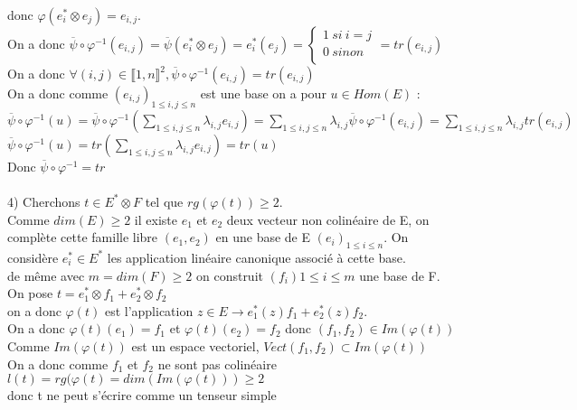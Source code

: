 \documentclass{article}
\begin{document}
donc $\varphi(e^\ast_i \otimes e_{j})= e_{i,j}$. \\
On a donc $\overline{\psi} \circ \varphi^{-1}(e_{i,j})= \overline{\psi}(e^\ast_i \otimes e_{j})=e^*_i(e_j)=\begin{cases}
1 \ si \ i=j \\
0 \ sinon \\
\end{cases}=tr(e_{i,j})$ \\
On a donc $\forall (i,j) \in \llbracket1,n\rrbracket^2,\overline{\psi} \circ \varphi^{-1}(e_{i,j})=tr(e_{i,j})$ \\
On a donc comme $(e_{i,j})_{ 1 \leq i,j \leq n}$ est une base on a pour $u \in Hom(E)$ : \\
$\overline{\psi} \circ \varphi^{-1}(u)=\overline{\psi} \circ \varphi^{-1}(\sum_{ 1 \leq i,j\leq n} \lambda_{i,j} e_{i,j})=\sum_{ 1 \leq i,j\leq n} \lambda_{i,j}\overline{\psi} \circ \varphi^{-1}(e_{i,j})=\sum_{ 1 \leq i,j\leq n}\lambda_{i,j} tr(e_{i,j})$ \\
$\overline{\psi} \circ \varphi^{-1}(u)= tr(\sum_{ 1 \leq i,j\leq n}\lambda_{i,j} e_{i,j})=tr(u)$ \\
Donc $\overline{\psi} \circ \varphi^{-1}=tr$ \\
\\
4) Cherchons $t\in E^* \otimes F$ tel que $rg(\varphi(t))\geq 2$. \\
Comme $dim(E)\geq 2$ il existe $e_1$ et $e_2$ deux vecteur non colinéaire de E, on complète cette famille libre $(e_1,e_2)$ en une base de E $(e_i)_{1\leq i \leq n}$. On considère $e^*_i \in E^*$ les application linéaire canonique associé à cette base. \\
de même avec $m=dim(F) \geq 2$ on construit $(f_i){1\leq i \leq m}$ une base de F. \\
On pose $t=e^*_1 \otimes f_1 + e^*_2 \otimes f_2$ \\
on a donc $\varphi(t)$ est l'application $z \in E \rightarrow e^*_1(z) f_1 + e^*_2(z) f_2$. \\
On a donc $\varphi(t)(e_1)=f_1$ et $\varphi(t)(e_2)=f_2$ donc $(f_1,f_2) \in Im(\varphi(t))$ \\
Comme $Im(\varphi(t))$ est un espace vectoriel, $Vect(f_1,f_2) \subset Im(\varphi(t))$ \\
On a donc comme $f_1$ et $f_2$ ne sont pas colinéaire $l(t)=rg(\varphi(t)=dim(Im(\varphi(t))) \geq 2$ \\
donc t ne peut s'écrire comme un tenseur simple
\end{document}
